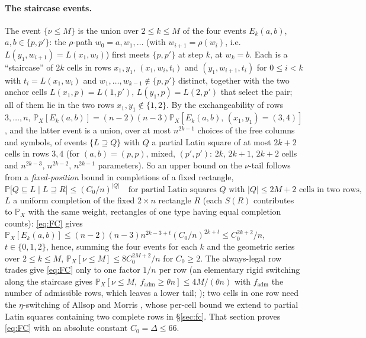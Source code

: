 \documentclass[11pt]{article}
\theoremstyle{definition}
\renewcommand{\Pr}{\mathbb{P}}
\begin{document}
\paragraph{The staircase events.}  The event $\{\nu\le M\}$ is the union
over $2\le k\le M$ of the four events $E_k(a,b)$, $a,b\in\{p,p'\}$: the $\rho$-path
$w_0=a,w_1,\dots$ (with $w_{i+1}=\rho(w_i)$, i.e.\ $L(y_1,w_{i+1})=L(x_1,w_i)$) first meets
$\{p,p'\}$ at step $k$, at $w_k=b$.  Each is a ``staircase'' of $2k$ cells in rows $x_1,y_1$,
$(x_1,w_i,t_i)$ and $(y_1,w_{i+1},t_i)$ for $0\le i<k$ with $t_i=L(x_1,w_i)$ and
$w_1,\dots,w_{k-1}\notin\{p,p'\}$ distinct, together with the two anchor cells
$L(x_1,p)=L(1,p')$, $L(y_1,p)=L(2,p')$ that select the pair; all of them lie in the two rows
$x_1,y_1\notin\{1,2\}$.  By the exchangeability of rows $3,\dots,n$,
$\Pr_X[E_k(a,b)]=(n-2)(n-3)\Pr_X[E_k(a,b),\,(x_1,y_1)=(3,4)]$, and the latter event is a
union, over at most $n^{2k-1}$ choices of the free columns and symbols, of events
$\{L\supseteq Q\}$ with $Q$ a partial Latin square of at most $2k+2$ cells in rows $3,4$
(for $(a,b)=(p,p)$, mixed, $(p',p')$: $2k$, $2k+1$, $2k+2$ cells and $n^{2k-3}$, $n^{2k-2}$,
$n^{2k-1}$ parameters).  So an upper bound on the $\nu$-tail follows from a
\emph{fixed-position} bound in completions of a fixed rectangle,
\begin{equation}\label{eq:FC}
\Pr\bigl[Q\subseteq L\;\big|\;L\supseteq R\bigr]\le(C_0/n)^{|Q|}
\quad\text{for partial Latin squares $Q$ with $|Q|\le2M+2$ cells in two rows,}
\end{equation}
$L$ a uniform completion of the fixed $2\times n$ rectangle $R$ (each $S(R)$ contributes
to $\Pr_X$ with the same weight, rectangles of one type having equal completion counts):
\eqref{eq:FC} gives $\Pr_X[E_k(a,b)]\le(n-2)(n-3)n^{2k-3+t}(C_0/n)^{2k+t}\le C_0^{2k+2}/n$,
$t\in\{0,1,2\}$, hence, summing the four events for each $k$ and the geometric series over
$2\le k\le M$, $\Pr_X[\nu\le M]\le8C_0^{2M+2}/n$ for $C_0\ge2$.  The always-legal row
trades give \eqref{eq:FC} only to one factor $1/n$ per row (an elementary rigid switching
along the staircase gives $\Pr_X[\nu\le M,\ f_{\mathrm{adm}}\ge\theta n]\le4M/(\theta n)$
with $f_{\mathrm{adm}}$ the number of admissible rows, which leaves a lower tail;
\cite{repo}); two cells in one row need the
$\eta$-switching of Allsop and Morris \cite{AM26}, whose per-cell bound we extend to
partial Latin squares containing two complete rows in \S\ref{sec:fc}.  That section proves
\eqref{eq:FC} with an absolute constant $C_0=\Delta\le66$.
\end{document}
